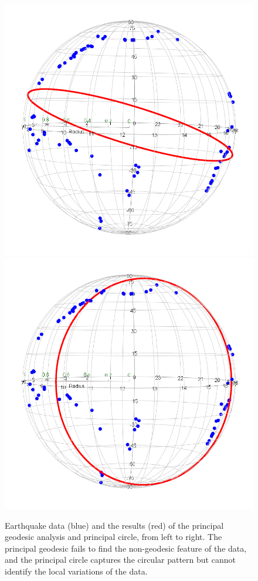 \begin{figure}[h]
    \centering
    \includegraphics[scale=0.265]{figures/PGA(earthquake).png}
    \hspace{1cm}
    \includegraphics[scale=0.265]{figures/PC(earthquake).png}
    \caption{Earthquake data (blue) and the results (red) of the principal geodesic analysis and principal circle, from left to right. The principal geodesic fails to find the non-geodesic feature of the data, and the principal circle captures the circular pattern but cannot identify the local variations of the data.} 
    \label{fig:PGAPC}
\end{figure}

